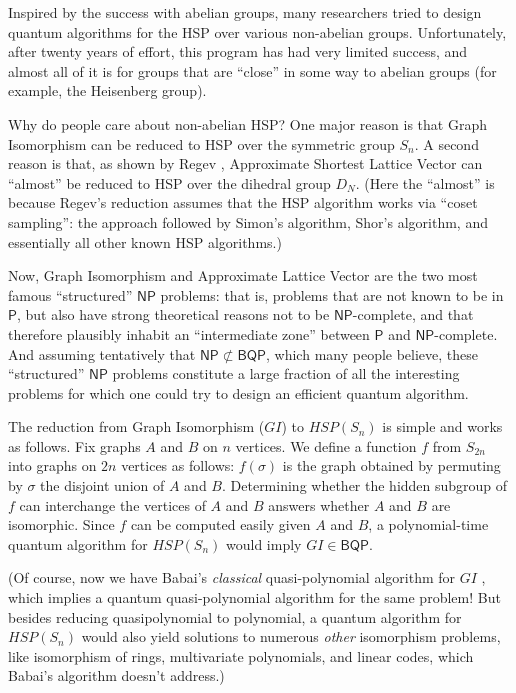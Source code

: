 \documentclass[11pt]{report}
\theoremstyle{plain}
\theoremstyle{definition}
\begin{document}
Inspired by the success with abelian groups, many researchers tried to design quantum algorithms for the HSP over various non-abelian groups. Unfortunately,
after twenty years of effort, this program has had very limited success, and almost all of it is for groups that are ``close'' in some way to abelian groups (for example, the Heisenberg group).

Why do people care about non-abelian HSP?  One major reason is that Graph Isomorphism can be reduced to HSP over the symmetric group $S_n$.
 A second reason is that, as shown by Regev \cite{Regev04}, Approximate Shortest Lattice Vector
 can ``almost'' be reduced to HSP over the dihedral group $D_N$. (Here the ``almost'' is because Regev's reduction assumes that the HSP algorithm works via ``coset sampling'': the approach followed by Simon's algorithm, Shor's algorithm, and essentially all other known HSP algorithms.)

Now, Graph Isomorphism and Approximate Lattice Vector are the two most famous ``structured'' $\mathsf{NP}$ problems: that is, problems that are not known to be in $\mathsf{P}$, but also have strong theoretical reasons not to be $\mathsf{NP}$-complete, and that therefore plausibly inhabit an ``intermediate zone'' between $\mathsf{P}$ and $\mathsf{NP}$-complete. And assuming tentatively that $\mathsf{NP} \not\subset \mathsf{BQP}$, which many people believe, these ``structured'' $\mathsf{NP}$ problems constitute a large fraction of all the interesting problems for which one could try to design an efficient quantum algorithm.

The reduction from Graph Isomorphism ($GI$) to $HSP(S_n)$ is  simple and works as follows. Fix graphs $A$ and $B$
on $n$ vertices. We define a function $f$ from  $S_{2n}$ into graphs on $2n$ vertices as follows: $f(\sigma)$ is the graph obtained by permuting by $\sigma$ the disjoint union of
$A$ and $B$. Determining whether the hidden subgroup of $f$ can interchange the vertices of $A$ and $B$ answers whether $A$ and $B$
are isomorphic. Since $f$ can be computed easily given $A$ and $B$, a polynomial-time quantum algorithm for $HSP(S_n)$ would imply $GI\in \mathsf{BQP}$.

(Of course, now we have Babai's {\em classical} quasi-polynomial algorithm for $GI$ \cite{Babai16}, which implies a quantum quasi-polynomial algorithm for the same problem!  But besides reducing quasipolynomial to polynomial, a quantum algorithm for $HSP(S_n)$ would also yield solutions to numerous {\em other} isomorphism problems, like isomorphism of rings, multivariate polynomials, and linear codes, which Babai's algorithm doesn't address.)
\end{document}
